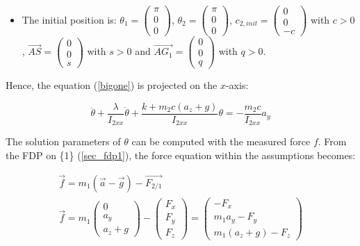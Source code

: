 \documentclass[\main/main.tex]{subfiles}
\begin{document}
\begin{itemize}
 \item The initial position is: $\theta_1 =
       \begin{pmatrix}
        \pi \\
        0 \\
        0
       \end{pmatrix}$, $\theta_2 =
       \begin{pmatrix}
        \pi \\
        0 \\
        0
       \end{pmatrix}$, $c_{2, init} =
       \begin{pmatrix}
        0 \\
        0 \\
        -c
       \end{pmatrix}$ with $c > 0$, $\overrightarrow{AS} =
       \begin{pmatrix}
        0  \\
        0  \\
        s
       \end{pmatrix}$ with $s > 0$ and $\overrightarrow{AG_1} =
       \begin{pmatrix}
        0  \\
        0  \\
        q
       \end{pmatrix}$ with $q > 0$.

\end{itemize}

Hence, the equation (\ref{bigone}) is projected on the $x$-axis:

\begin{equation*}
 \ddot{\theta} + \frac{\lambda}{I_{2xx}} \dot{\theta} + \frac{k + m_2 c (a_z + g)}{I_{2xx}} \theta = - \frac{m_2 c}{I_{2xx}} a_y
\end{equation*}

The solution parameters of $\theta$ can be computed with the measured force $f$. From the FDP on \{1\} (\ref{sec_fdp1}), the force equation within the assumptions becomes:

\begin{gather}
  \label{fdp1_2d}
 \overrightarrow{f} = m_1 (\overrightarrow{a} - \overrightarrow{g}) - \overrightarrow{F_{2/1}} \\
 \overrightarrow{f} = m_1
 \begin{pmatrix}
  0  \\
  a_y  \\
  a_z + g
 \end{pmatrix}
 - \begin{pmatrix}
 F_x \\
 F_y \\
 F_z
 \end{pmatrix}
 = \begin{pmatrix}
 - F_x \\
 m_1 a_y - F_y \\
 m_1 (a_z + g) - F_z
 \end{pmatrix}
\end{gather}
\end{document}
